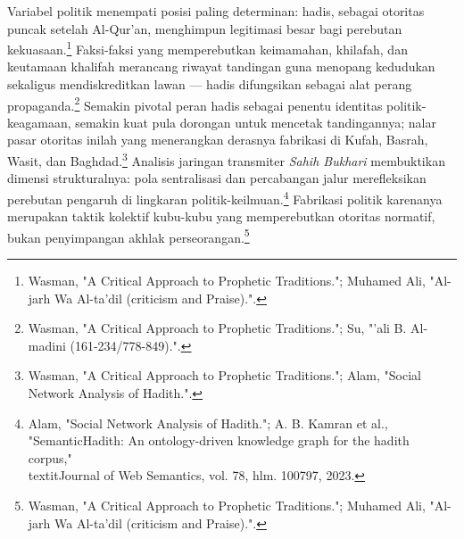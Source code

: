 Variabel politik menempati posisi paling determinan: hadis, sebagai otoritas puncak setelah Al-Qur'an, menghimpun legitimasi besar bagi perebutan kekuasaan.\footnote{Wasman, "A Critical Approach to Prophetic Traditions."; Muhamed Ali, "Al-jarh Wa Al-ta'dil (criticism and Praise).".} Faksi-faksi yang memperebutkan keimamahan, khilafah, dan keutamaan khalifah merancang riwayat tandingan guna menopang kedudukan sekaligus mendiskreditkan lawan --- hadis difungsikan sebagai alat perang propaganda.\footnote{Wasman, "A Critical Approach to Prophetic Traditions."; Su, "'ali B. Al-madini (161-234/778-849).".} Semakin pivotal peran hadis sebagai penentu identitas politik-keagamaan, semakin kuat pula dorongan untuk mencetak tandingannya; nalar pasar otoritas inilah yang menerangkan derasnya fabrikasi di Kufah, Basrah, Wasit, dan Baghdad.\footnote{Wasman, "A Critical Approach to Prophetic Traditions."; Alam, "Social Network Analysis of Hadith.".} Analisis jaringan transmiter \textit{Sahih Bukhari} membuktikan dimensi strukturalnya: pola sentralisasi dan percabangan jalur merefleksikan perebutan pengaruh di lingkaran politik-keilmuan.\footnote{Alam, "Social Network Analysis of Hadith."; A. B. Kamran et al., "SemanticHadith: An ontology-driven knowledge graph for the hadith corpus," \\textit{Journal of Web Semantics}, vol. 78, hlm. 100797, 2023.} Fabrikasi politik karenanya merupakan taktik kolektif kubu-kubu yang memperebutkan otoritas normatif, bukan penyimpangan akhlak perseorangan.\footnote{Wasman, "A Critical Approach to Prophetic Traditions."; Muhamed Ali, "Al-jarh Wa Al-ta'dil (criticism and Praise).".}


